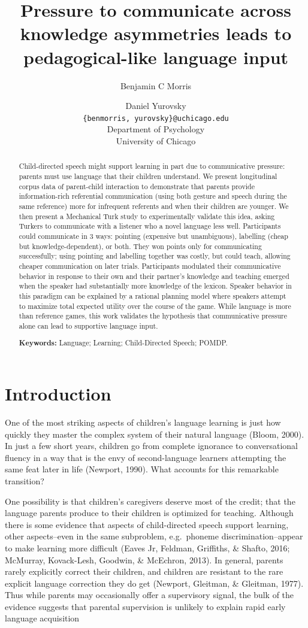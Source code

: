 \documentclass[10pt, letterpaper]{article}
\title{Pressure to communicate across knowledge asymmetries leads to
pedagogical-like language input}
\author{Benjamin C Morris \and Daniel Yurovsky \\
        \texttt{\{benmorris, yurovsky\}@uchicago.edu} \\
       Department of Psychology \\ University of Chicago}
\begin{document}
\maketitle

\begin{abstract}
Child-directed speech might support learning in part due to
communicative pressure: parents must use language that their children
understand. We present longitudinal corpus data of parent-child
interaction to demonstrate that parents provide information-rich
referential communication (using both gesture and speech during the same
reference) more for infrequent referents and when their children are
younger. We then present a Mechanical Turk study to experimentally
validate this idea, asking Turkers to communicate with a listener who a
novel language less well. Participants could communicate in 3 ways:
pointing (expensive but unambiguous), labelling (cheap but
knowledge-dependent), or both. They won points only for communicating
successfully; using pointing and labelling together was costly, but
could teach, allowing cheaper communication on later trials.
Participants modulated their communicative behavior in response to their
own and their partner's knowledge and teaching emerged when the speaker
had substantially more knowledge of the lexicon. Speaker behavior in
this paradigm can be explained by a rational planning model where
speakers attempt to maximize total expected utility over the course of
the game. While language is more than reference games, this work
validates the hypothesis that communicative pressure alone can lead to
supportive language input.

\textbf{Keywords:}
Language; Learning; Child-Directed Speech; POMDP.
\end{abstract}

\section{Introduction}\label{introduction}

One of the most striking aspects of children's language learning is just
how quickly they master the complex system of their natural language
(Bloom, 2000). In just a few short years, children go from complete
ignorance to conversational fluency in a way that is the envy of
second-language learners attempting the same feat later in life
(Newport, 1990). What accounts for this remarkable transition?

One possibility is that children's caregivers deserve most of the
credit; that the language parents produce to their children is optimized
for teaching. Although there is some evidence that aspects of
child-directed speech support learning, other aspects--even in the same
subproblem, e.g.~phoneme discrimination--appear to make learning more
difficult (Eaves Jr, Feldman, Griffiths, \& Shafto, 2016; McMurray,
Kovack-Lesh, Goodwin, \& McEchron, 2013). In general, parents rarely
explicitly correct their children, and children are resistant to the
rare explicit language correction they do get (Newport, Gleitman, \&
Gleitman, 1977). Thus while parents may occasionally offer a supervisory
signal, the bulk of the evidence suggests that parental supervision is
unlikely to explain rapid early language acquisition
\end{document}
